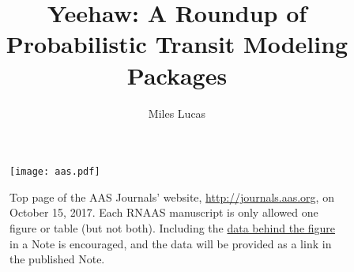 \documentclass[RNAAS]{aastex631}
\begin{document}
\title{Yeehaw: A Roundup of Probabilistic Transit Modeling Packages}


\author[0000-0001-6341-310X]{Miles Lucas}


\keywords{}

\section{} 


\begin{figure}[h!]
\begin{center}
\texttt{[image: aas.pdf]}
\caption{Top page of the AAS Journals' website, \url{http://journals.aas.org},
on October 15, 2017.  Each RNAAS manuscript is only allowed one figure or
table (but not both). Including the
\href{http://journals.aas.org//authors/data.html\#DbF}{data behind the figure}
in a Note is encouraged, and the data will be provided as a link in the
published Note.\label{fig:1}}
\end{center}
\end{figure}



{}

\end{document}
